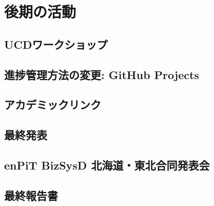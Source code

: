 \chapter{後期の活動}

\section{UCDワークショップ}

\section{進捗管理方法の変更: GitHub Projects}

\section{アカデミックリンク}

\section{最終発表}

\section{enPiT BizSysD 北海道・東北合同発表会}

\section{最終報告書}
